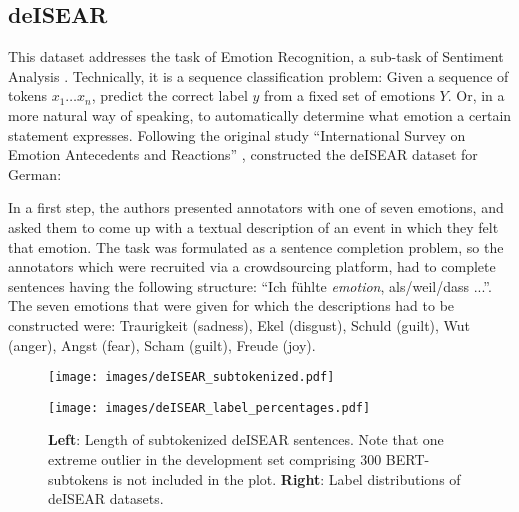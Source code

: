 \subsection{deISEAR}

This dataset addresses the task of Emotion Recognition, a sub-task of Sentiment Analysis
\citep{cambria2017affective}. Technically, it is a sequence classification problem: Given a
sequence of tokens $x_1 \dotso x_n$, predict the correct label $y$ from a fixed set of emotions
$Y$. Or, in a more natural way of speaking, to automatically determine what emotion a certain
statement expresses. Following the original study ``International Survey on Emotion Antecedents
and Reactions'' \citep{scherer1994evidence}, \cite{troiano2019crowdsourcing} constructed the
deISEAR dataset for German:

In a first step, the authors presented annotators with one of seven emotions, and asked them
to come up with a textual description of an event in which they felt that emotion. The task
was formulated as a sentence completion problem, so the annotators which were recruited via
a crowdsourcing platform, had to complete sentences having the following structure: ``Ich
fühlte \emph{emotion}, als/weil/dass ...''. The seven emotions that were given for which
the descriptions had to be constructed were: Traurigkeit (sadness), Ekel (disgust), Schuld
(guilt), Wut (anger), Angst (fear), Scham (guilt), Freude (joy).

\begin{figure}
  \begin{minipage}{0.45\linewidth}
  \vspace{0pt}
    \texttt{[image: images/deISEAR\_subtokenized.pdf]}
  \end{minipage}
  \hfill
  \begin{minipage}{0.45\linewidth}
  \vspace{0pt}
    \texttt{[image: images/deISEAR\_label\_percentages.pdf]}
  \end{minipage}
  \caption[XNLI Lengths]{\textbf{Left}: Length of subtokenized deISEAR sentences. Note that one extreme outlier in the
                          development set comprising 300 BERT-subtokens is not included in the plot. \textbf{Right}: Label distributions of deISEAR datasets.}
  \label{fig:deisear-stats}
\end{figure}

